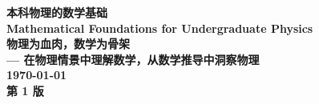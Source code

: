 \documentclass[12pt,a4paper,openany]{ctexbook}
\theoremstyle{definition}
\theoremstyle{remark}
\begin{document}
\begin{titlepage}
    \centering
    \vspace*{4cm}
    \Huge\bfseries 本科物理的数学基础 \\[1cm]
    \Large Mathematical Foundations for Undergraduate Physics \\[2cm]
    \large 物理为血肉，数学为骨架 \\[0.5cm]
    \large — 在物理情景中理解数学，从数学推导中洞察物理 \\[3cm]
    \large \today \\[1cm]
    \large 第 1 版
    \vfill
\end{titlepage}

\tableofcontents
\clearpage







\appendix
\end{document}
